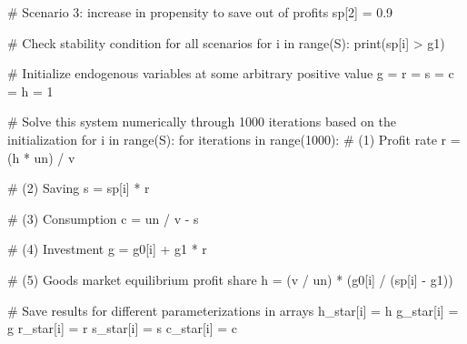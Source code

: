 \documentclass[
  letterpaper,
  DIV=11,
  numbers=noendperiod]{scrreprt}
\newenvironment{Shaded}{\begin{snugshade}}{\end{snugshade}}
\newcommand{\BuiltInTok}[1]{\textcolor[rgb]{0.00,0.23,0.31}{#1}}
\newcommand{\CommentTok}[1]{\textcolor[rgb]{0.37,0.37,0.37}{#1}}
\newcommand{\ControlFlowTok}[1]{\textcolor[rgb]{0.00,0.23,0.31}{#1}}
\newcommand{\DecValTok}[1]{\textcolor[rgb]{0.68,0.00,0.00}{#1}}
\newcommand{\FloatTok}[1]{\textcolor[rgb]{0.68,0.00,0.00}{#1}}
\newcommand{\KeywordTok}[1]{\textcolor[rgb]{0.00,0.23,0.31}{#1}}
\newcommand{\NormalTok}[1]{\textcolor[rgb]{0.00,0.23,0.31}{#1}}
\newcommand{\OperatorTok}[1]{\textcolor[rgb]{0.37,0.37,0.37}{#1}}
\begin{document}
\begin{tcolorbox}
\begin{Shaded}
\begin{Highlighting}[]
\CommentTok{\# Scenario 3: increase in propensity to save out of profits}
\NormalTok{sp[}\DecValTok{2}\NormalTok{] }\OperatorTok{=} \FloatTok{0.9}

\CommentTok{\# Check stability condition for all scenarios}
\ControlFlowTok{for}\NormalTok{ i }\KeywordTok{in} \BuiltInTok{range}\NormalTok{(S):}
    \BuiltInTok{print}\NormalTok{(sp[i] }\OperatorTok{\textgreater{}}\NormalTok{ g1)}



\CommentTok{\# Initialize endogenous variables at some arbitrary positive value}
\NormalTok{g }\OperatorTok{=}\NormalTok{ r }\OperatorTok{=}\NormalTok{ s }\OperatorTok{=}\NormalTok{ c }\OperatorTok{=}\NormalTok{ h }\OperatorTok{=} \DecValTok{1}

\CommentTok{\# Solve this system numerically through 1000 iterations based on the initialization}
\ControlFlowTok{for}\NormalTok{ i }\KeywordTok{in} \BuiltInTok{range}\NormalTok{(S):}
    \ControlFlowTok{for}\NormalTok{ iterations }\KeywordTok{in} \BuiltInTok{range}\NormalTok{(}\DecValTok{1000}\NormalTok{):}
        \CommentTok{\# (1) Profit rate}
\NormalTok{        r }\OperatorTok{=}\NormalTok{ (h }\OperatorTok{*}\NormalTok{ un) }\OperatorTok{/}\NormalTok{ v}

        \CommentTok{\# (2) Saving}
\NormalTok{        s }\OperatorTok{=}\NormalTok{ sp[i] }\OperatorTok{*}\NormalTok{ r}

        \CommentTok{\# (3) Consumption}
\NormalTok{        c }\OperatorTok{=}\NormalTok{ un }\OperatorTok{/}\NormalTok{ v }\OperatorTok{{-}}\NormalTok{ s}

        \CommentTok{\# (4) Investment}
\NormalTok{        g }\OperatorTok{=}\NormalTok{ g0[i] }\OperatorTok{+}\NormalTok{ g1 }\OperatorTok{*}\NormalTok{ r}

        \CommentTok{\# (5) Goods market equilibrium profit share}
\NormalTok{        h }\OperatorTok{=}\NormalTok{ (v }\OperatorTok{/}\NormalTok{ un) }\OperatorTok{*}\NormalTok{ (g0[i] }\OperatorTok{/}\NormalTok{ (sp[i] }\OperatorTok{{-}}\NormalTok{ g1))}

    \CommentTok{\# Save results for different parameterizations in arrays}
\NormalTok{    h\_star[i] }\OperatorTok{=}\NormalTok{ h}
\NormalTok{    g\_star[i] }\OperatorTok{=}\NormalTok{ g}
\NormalTok{    r\_star[i] }\OperatorTok{=}\NormalTok{ r}
\NormalTok{    s\_star[i] }\OperatorTok{=}\NormalTok{ s}
\NormalTok{    c\_star[i] }\OperatorTok{=}\NormalTok{ c}
\end{Highlighting}
\end{Shaded}

\end{tcolorbox}
\end{document}
